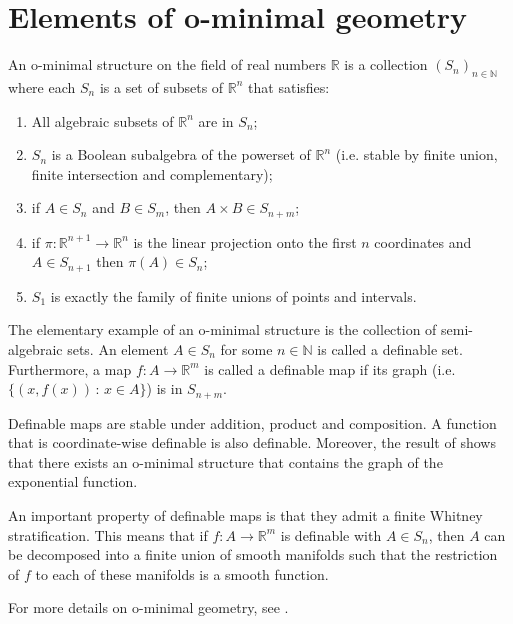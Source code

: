 \section{Elements of o-minimal geometry}\label{apdx:o-minimal}

\begin{definition} An o-minimal structure on the field of real numbers $\mathbb{R}$ is a collection $(S_n)_{n\in\mathbb{N}}$ where each $S_n$ is a set of subsets of $\mathbb{R}^n$ that satisfies:
\begin{enumerate}
    \item  All algebraic subsets of $\mathbb{R}^n$ are in $S_n$;
    \item  $S_n$ is a Boolean subalgebra of the powerset of $\mathbb{R}^n$ (i.e. stable by finite union, finite intersection and complementary);
    \item  if $A\in S_n$ and $B\in S_m$, then $A\times B\in S_{n+m}$;
    \item  if $\pi\colon\mathbb{R}^{n+1}\to\mathbb{R}^n$ is the linear projection onto the first $n$ coordinates and $A\in S_{n+1}$ then $\pi(A)\in S_n$;
    \item  $S_1$ is exactly the family of finite unions of points and intervals.
\end{enumerate}
\end{definition}

The elementary example of an o-minimal structure is the collection of semi-algebraic sets. An element $A\in S_n$ for some $n\in\mathbb{N}$ is called a definable set. Furthermore, a map $f \colon  A\to \mathbb{R}^m$ is called a definable map if its graph (i.e. $\{(x,f(x))\,:\,x\in A\}$) is in $S_{n+m}$. 

Definable maps are stable under addition, product and composition. A function that is coordinate-wise definable is also definable. Moreover, the result of \cite{wilkie1996model} shows that there exists an o-minimal structure that contains the graph of the exponential function. 

An important property of definable maps is that they admit a finite Whitney stratification. This means that if $f \colon  A\to \mathbb{R}^m$ is definable with $A\in S_n$, then $A$ can be decomposed into a finite union of smooth manifolds such that the restriction of $f$ to each of these manifolds is a smooth function. 

For more details on o-minimal geometry, see \cite{coste2000introduction}.

